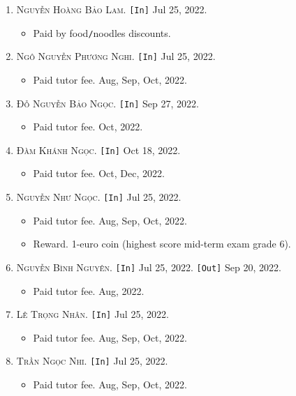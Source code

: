 \documentclass{article}
\numberwithin{equation}{section}
\begin{document}
\begin{enumerate}
\begin{itemize}
	\end{itemize}
	\item \textsc{Nguyễn Hoàng Bảo Lam.} \texttt{[In]} Jul 25, 2022.
	\begin{itemize}
		\item \textsf{Paid by food\texttt{/}noodles discounts.}
	\end{itemize}
	\item \textsc{Ngô Nguyễn Phương Nghi.} \texttt{[In]} Jul 25, 2022.
	\begin{itemize}
		\item \textsf{Paid tutor fee.} Aug, Sep, Oct, 2022.
	\end{itemize}
	\item \textsc{Đỗ Nguyễn Bảo Ngọc.} \texttt{[In]} Sep 27, 2022.
	\begin{itemize}
		\item \textsf{Paid tutor fee.} Oct, 2022.
	\end{itemize}
	\item \textsc{Đàm Khánh Ngọc.} \texttt{[In]} Oct 18, 2022.
	\begin{itemize}
		\item \textsf{Paid tutor fee.} Oct, Dec, 2022.
	\end{itemize}
	\item \textsc{Nguyễn Như Ngọc.} \texttt{[In]} Jul 25, 2022.
	\begin{itemize}
		\item \textsf{Paid tutor fee.} Aug, Sep, Oct, 2022.
		\item \textsf{Reward.} 1-euro coin (highest score mid-term exam grade 6).
	\end{itemize}
	\item \textsc{Nguyễn Bình Nguyên.} \texttt{[In]} Jul 25, 2022. \texttt{[Out]} Sep 20, 2022.
	\begin{itemize}
		\item \textsf{Paid tutor fee.} Aug, 2022.
	\end{itemize}
	\item \textsc{Lê Trọng Nhân.} \texttt{[In]} Jul 25, 2022.
	\begin{itemize}
		\item \textsf{Paid tutor fee.} Aug, Sep, Oct, 2022.
	\end{itemize}
	\item \textsc{Trần Ngọc Nhi.} \texttt{[In]} Jul 25, 2022.
	\begin{itemize}
		\item \textsf{Paid tutor fee.} Aug, Sep, Oct, 2022.
	\end{itemize}

\end{enumerate}
\end{document}
